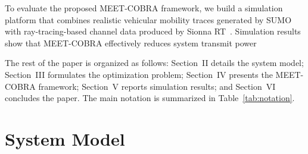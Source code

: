 \documentclass[10pt,journal,letterpaper]{journal_template/IEEEtran}
\newcommand{\rev}[1]{\textcolor{revisioncolor}{{}#1}}
\newif\ifshowdeletions
\newcommand{\currentdel}[1]{\ifshowdeletions\textcolor{deletioncolor}{\sout{#1}}\fi}
\theoremstyle{remark}
\begin{document}
To evaluate the proposed MEET-COBRA framework, we build a simulation platform that combines realistic vehicular mobility traces generated by SUMO~\cite{behrisch2011sumo} with ray-tracing-based channel data produced by Sionna RT~\cite{sionnaRT}. 
Simulation results show that MEET-COBRA effectively reduces system transmit power \currentdel{while improving the adherence to latency constraints across different traffic loads.}




The rest of the paper is organized as follows: Section~II details the system model; Section~III formulates the optimization problem; Section~IV presents the MEET-COBRA framework; Section~V reports simulation results; and Section~VI concludes the paper.
\rev{The main notation is summarized in Table~\ref{tab:notation}.}


\section{System Model}{\label{sec:System Model}}
\end{document}
